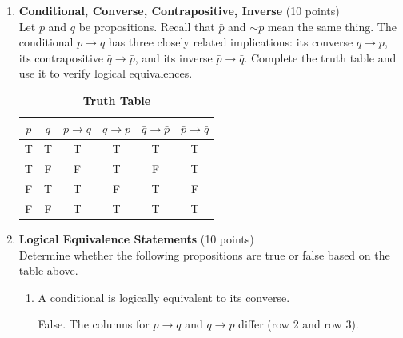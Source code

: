 \begin{enumerate}
\begin{enumerate}[label=\arabic*.]
    \item $(p \wedge \bar{q}) \rightarrow(p \wedge \bar{p})$\\
    \begin{subanswer}
      $A$. Truth vector is $(T,F,T,T)$ which matches $p\rightarrow q$ (this implication is logically equivalent to the contrapositive form).
    \end{subanswer}

    \item $\bar{p} \vee q$\\
    \begin{subanswer}
      $A$. $\bar{p}\vee q$ is the standard disjunctive form of implication and has truth vector $(T,F,T,T)$ equal to $p\rightarrow q$.
    \end{subanswer}
  \end{enumerate}


  \newpage



  \item \textbf{Conditional, Converse, Contrapositive, Inverse} (10 points)\\
  Let $p$ and $q$ be propositions. Recall that $\bar{p}$ and $\sim p$ mean the same thing.  
  The conditional $p \rightarrow q$ has three closely related implications: its converse $q \rightarrow p$, its contrapositive $\bar{q} \rightarrow \bar{p}$, and its inverse $\bar{p} \rightarrow \bar{q}$.  
  Complete the truth table and use it to verify logical equivalences.

  \begin{table}[h!]
  \centering
  \renewcommand{\arraystretch}{1.3}
  \setlength{\tabcolsep}{10pt}
  \caption*{\textbf{Truth Table}}
  \begin{tabular}{|c|c|c|c|c|c|}
  \hline
  \rowcolor[HTML]{E0E0E0}
  $p$ & $q$ & $p \rightarrow q$ & $q \rightarrow p$ & $\bar{q} \rightarrow \bar{p}$ & $\bar{p} \rightarrow \bar{q}$ \\
  \hline
  T & T & T & T & T & T \\
  \hline
  T & F & F & T & F & T \\
  \hline
  F & T & T & F & T & F \\
  \hline
  F & F & T & T & T & T \\
  \hline
  \end{tabular}
  \end{table}

  \item \textbf{Logical Equivalence Statements} (10 points)\\
  Determine whether the following propositions are true or false based on the table above.
  \begin{enumerate}
    \item A conditional is logically equivalent to its converse.\\
    \begin{subanswer}
      False. The columns for $p \rightarrow q$ and $q \rightarrow p$ differ (row 2 and row 3).
    \end{subanswer}


\end{enumerate}
\end{enumerate}
